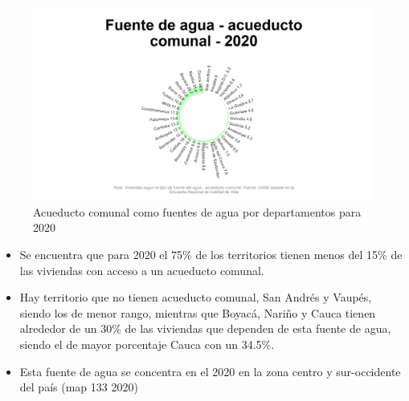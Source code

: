     \begin{figure}[H]
        \caption{Acueducto comunal como fuentes de agua por departamentos para 2020 \label{map_result_2} }
        \begin{center}
        \includegraphics[width=\textwidth,keepaspectratio]{img/var_133_static.png}
        \end{center}
    \end{figure}
            \begin{itemize}
                    \item Se encuentra que para 2020 el 75\% de los territorios tienen menos del 15\% de las viviendas con acceso a un acueducto comunal.
                    \item Hay territorio que no tienen acueducto comunal, San Andrés y Vaupés, siendo los de menor rango, mientras que Boyacá, Nariño y Cauca tienen alrededor de un 30\% de las viviendas que dependen de esta fuente de agua, siendo el de mayor porcentaje Cauca con un 34.5\%.
                    \item Esta fuente de agua se concentra en el 2020 en la zona centro y sur-occidente del país (map 133 2020)
                    \end{itemize}

